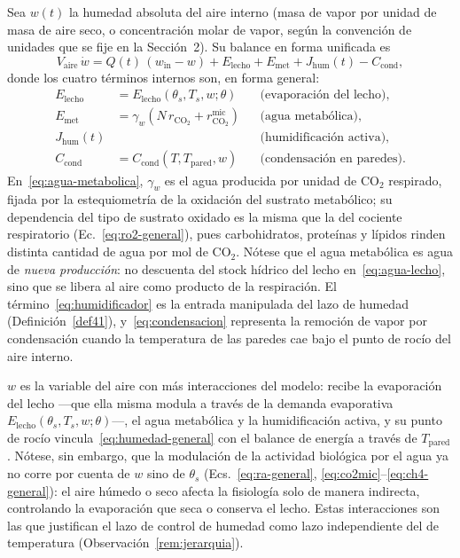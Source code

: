 Sea $w(t)$ la humedad absoluta del aire interno (masa de vapor por unidad de masa de aire seco, o concentraci\'on molar de vapor, seg\'un la convenci\'on de unidades que se fije en la Secci\'on~2). Su balance en forma unificada es
\begin{equation}
V_{\mathrm{aire}}\,\dot w = Q(t)\,(w_{\mathrm{in}} - w) + E_{\mathrm{lecho}} + E_{\mathrm{met}} + J_{\mathrm{hum}}(t) - C_{\mathrm{cond}},
\label{eq:humedad-general}
\end{equation}
donde los cuatro t\'erminos internos son, en forma general:
\begin{align}
E_{\mathrm{lecho}} &= E_{\mathrm{lecho}}(\theta_s, T_s, w; \theta) && \text{(evaporaci\'on del lecho)}, \label{eq:evap-lecho}\\
E_{\mathrm{met}} &= \gamma_w\left(N\,r_{\mathrm{CO_2}} + r^{\mathrm{mic}}_{\mathrm{CO_2}}\right) && \text{(agua metab\'olica)}, \label{eq:agua-metabolica}\\
J_{\mathrm{hum}}(t) & && \text{(humidificaci\'on activa)}, \label{eq:humidificador}\\
C_{\mathrm{cond}} &= C_{\mathrm{cond}}(T, T_{\mathrm{pared}}, w) && \text{(condensaci\'on en paredes)}. \label{eq:condensacion}
\end{align}
En~\eqref{eq:agua-metabolica}, $\gamma_w$ es el agua producida por unidad de CO$_2$ respirado, fijada por la estequiometr\'ia de la oxidaci\'on del sustrato metab\'olico; su dependencia del tipo de sustrato oxidado es la misma que la del cociente respiratorio (Ec.~\eqref{eq:ro2-general}), pues carbohidratos, prote\'inas y l\'ipidos rinden distinta cantidad de agua por mol de CO$_2$. N\'otese que el agua metab\'olica es agua de \emph{nueva producci\'on}: no descuenta del stock h\'idrico del lecho en~\eqref{eq:agua-lecho}, sino que se libera al aire como producto de la respiraci\'on. El t\'ermino~\eqref{eq:humidificador} es la entrada manipulada del lazo de humedad (Definici\'on~\ref{def41}), y~\eqref{eq:condensacion} representa la remoci\'on de vapor por condensaci\'on cuando la temperatura de las paredes cae bajo el punto de roc\'io del aire interno.

\begin{remark}
\label{rem:humedad-doble}
$w$ es la variable del aire con m\'as interacciones del modelo: recibe la evaporaci\'on del lecho ---que ella misma modula a trav\'es de la demanda evaporativa $E_{\mathrm{lecho}}(\theta_s, T_s, w; \theta)$---, el agua metab\'olica y la humidificaci\'on activa, y su punto de roc\'io vincula~\eqref{eq:humedad-general} con el balance de energ\'ia a trav\'es de $T_{\mathrm{pared}}$. N\'otese, sin embargo, que la modulaci\'on de la actividad biol\'ogica por el agua ya no corre por cuenta de $w$ sino de $\theta_s$ (Ecs.~\eqref{eq:ra-general}, \eqref{eq:co2mic}--\eqref{eq:ch4-general}): el aire h\'umedo o seco afecta la fisiolog\'ia solo de manera indirecta, controlando la evaporaci\'on que seca o conserva el lecho. Estas interacciones son las que justifican el lazo de control de humedad como lazo independiente del de temperatura (Observaci\'on~\ref{rem:jerarquia}).
\end{remark}

